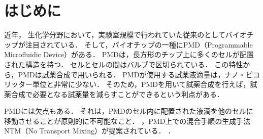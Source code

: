 \chapter{はじめに}
近年， 生化学分野において，実験室規模で行われていた従来のとしてバイオチップが注目されている．
そして，バイオチップの一種にPMD（Programmable Microfluidic Device）がある\cite{PMDDescription}．
PMDは，長方形のチップ上に多くのセルが配置された構造を持つ．
セルとセルの間はバルブで区切られている．
この特性から，PMDは試薬合成で用いられる\cite{C0LC00537A}．
PMDが使用する試薬液滴量は，ナノ・ピコリッター単位と非常に少ない．
そのため，PMDを用いて試薬合成を行えば，試薬合成で必要となる試薬量を減らすことができるという利点がある\cite{PMDDescription}．

PMDには欠点もある．
それは，PMDのセル内に配置された液滴を他のセルに移動させることが原則的に不可能なこと\cite{9116370}．
，PMD上での混合手順の生成手法NTM（No Transport Mixing）が提案されている\cite{9116370}．
．

